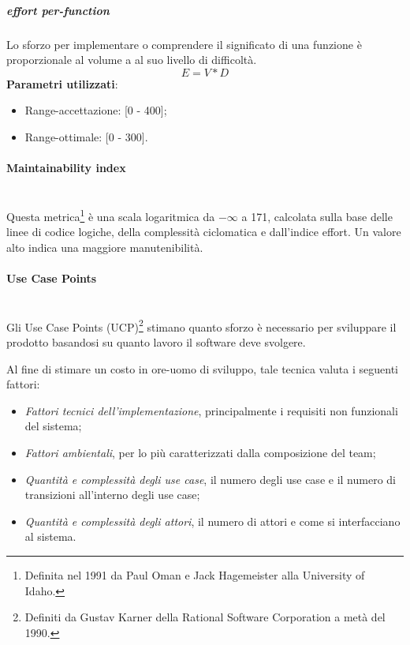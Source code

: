 			
			\subparagraph{ effort per-function}
			Lo sforzo per implementare o comprendere il significato di una funzione è proporzionale al volume a al suo livello di difficoltà.
			 \[
			 E = V * D
			\]
			\textbf{Parametri utilizzati}:
			\begin{itemize}
				\item Range-accettazione: [0 - 400];
				\item Range-ottimale: [0 - 300].
			\end{itemize}

			
			\paragraph{Maintainability index}\mbox{} \\

			Questa metrica\footnote{Definita nel 1991 da Paul Oman e Jack Hagemeister alla University of Idaho.} è una scala logaritmica da $-\infty$ a 171, calcolata sulla base delle linee di codice logiche, della complessità ciclomatica e dall'indice  effort. Un valore alto indica una maggiore manutenibilità.


			\paragraph{Use Case Points}\mbox{} \\
			\label{ucp}
			Gli Use Case Points (UCP)\footnote{Definiti da Gustav Karner della Rational Software Corporation a metà del 1990.} stimano quanto sforzo è necessario per sviluppare il prodotto basandosi su quanto lavoro il software deve svolgere.

			Al fine di stimare un costo in ore-uomo di sviluppo, tale tecnica valuta i seguenti fattori:

			\begin{itemize}
				\item \textit{Fattori tecnici dell'implementazione}, principalmente i requisiti non funzionali del sistema;
				\item \textit{Fattori ambientali}, per lo più caratterizzati dalla composizione del team;
				\item \textit{Quantità e complessità degli use case}, il numero degli use case e il numero di transizioni all'interno degli use case;
				\item \textit{Quantità e complessità degli attori}, il numero di attori e come si interfacciano al sistema.
			\end{itemize}


